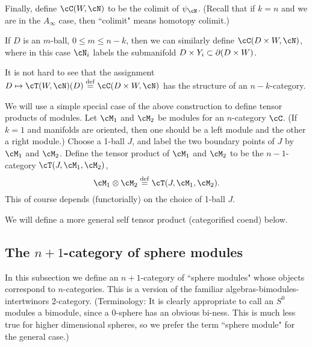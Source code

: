 Finally, define $\cC(W, \cN)$ to be the colimit of $\psi_\cN$.
(Recall that if $k=n$ and we are in the $A_\infty$ case, then ``colimit" means
homotopy colimit.)

If $D$ is an $m$-ball, $0\le m \le n-k$, then we can similarly define
$\cC(D\times W, \cN)$, where in this case $\cN_i$ labels the submanifold 
$D\times Y_i \subset \partial(D\times W)$.

It is not hard to see that the assignment $D \mapsto \cT(W, \cN)(D) \deq \cC(D\times W, \cN)$
has the structure of an $n{-}k$-category.

\medskip



We will use a simple special case of the above 
construction to define tensor products 
of modules.
Let $\cM_1$ and $\cM_2$ be modules for an $n$-category $\cC$.
(If $k=1$ and manifolds are oriented, then one should be 
a left module and the other a right module.)
Choose a 1-ball $J$, and label the two boundary points of $J$ by $\cM_1$ and $\cM_2$.
Define the tensor product of $\cM_1$ and $\cM_2$ to be the 
$n{-}1$-category $\cT(J, \cM_1, \cM_2)$,
\[
	\cM_1\otimes \cM_2 \deq \cT(J, \cM_1, \cM_2) .
\]
This of course depends (functorially)
on the choice of 1-ball $J$.

We will define a more general self tensor product (categorified coend) below.









\subsection{The $n{+}1$-category of sphere modules}

In this subsection we define an $n{+}1$-category of ``sphere modules" whose objects
correspond to $n$-categories.
This is a version of the familiar algebras-bimodules-intertwinors 2-category.
(Terminology: It is clearly appropriate to call an $S^0$ modules a bimodule,
since a 0-sphere has an obvious bi-ness.
This is much less true for higher dimensional spheres, 
so we prefer the term ``sphere module" for the general case.)



